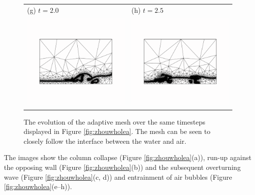 \begin{figure}[tbp]
\begin{center}
\begin{tabular}{ll}
(g) $t = 2.0$ & (h) $t = 2.5$ \\
\includegraphics[width=7cm, trim=2.5cm 4.5cm 2.5cm 4.5cm, clip=true]{examples_images/water_collapse/water_collapse_400_mesh.pdf} & \includegraphics[width=7cm, trim=2.5cm 4.5cm 2.5cm 4.5cm, clip=true]{examples_images/water_collapse/water_collapse_500_mesh.pdf} \\
\end{tabular}
\caption{The evolution of the adaptive mesh over the same timesteps displayed in Figure \ref{fig:zhouwholea}.  The mesh can be seen to closely follow the interface between the water and air.}
\label{fig:zhouwholemesh}
\end{center}
\end{figure}

The images show the column collapse (Figure \ref{fig:zhouwholea}(a)), run-up against the opposing wall (Figure \ref{fig:zhouwholea}(b)) and the subsequent overturning wave (Figure \ref{fig:zhouwholea}(c, d)) and entrainment of air bubbles (Figure \ref{fig:zhouwholea}(e--h)).  

